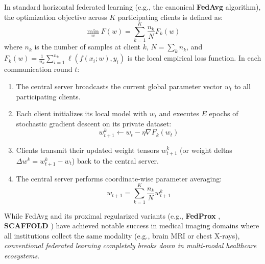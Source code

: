 \documentclass[12pt,a4paper]{amritareport}
\begin{document}
In standard horizontal federated learning (e.g., the canonical \textbf{FedAvg} algorithm), the optimization objective across $K$ participating clients is defined as:
\begin{equation}
	\min_{w} F(w) = \sum_{k=1}^{K} \frac{n_k}{N} F_k(w)
\end{equation}
where $n_k$ is the number of samples at client $k$, $N = \sum_k n_k$, and $F_k(w) = \frac{1}{n_k} \sum_{i=1}^{n_k} \ell(f(x_i; w), y_i)$ is the local empirical loss function. In each communication round $t$:
\begin{enumerate}
	\item The central server broadcasts the current global parameter vector $w_t$ to all participating clients.
	\item Each client initializes its local model with $w_t$ and executes $E$ epochs of stochastic gradient descent on its private dataset:
	\begin{equation}
		w_{t+1}^k \leftarrow w_t - \eta \nabla F_k(w_t)
	\end{equation}
	\item Clients transmit their updated weight tensors $w_{t+1}^k$ (or weight deltas $\Delta w^k = w_{t+1}^k - w_t$) back to the central server.
	\item The central server performs coordinate-wise parameter averaging:
	\begin{equation}
		w_{t+1} = \sum_{k=1}^{K} \frac{n_k}{N} w_{t+1}^k
	\end{equation}
\end{enumerate}

While FedAvg and its proximal regularized variants (e.g., \textbf{FedProx} \cite{li2020federated}, \textbf{SCAFFOLD} \cite{karimireddy2020scaffold}) have achieved notable success in medical imaging domains where all institutions collect the same modality (e.g., brain MRI or chest X-rays), \textit{conventional federated learning completely breaks down in multi-modal healthcare ecosystems}.
\end{document}
